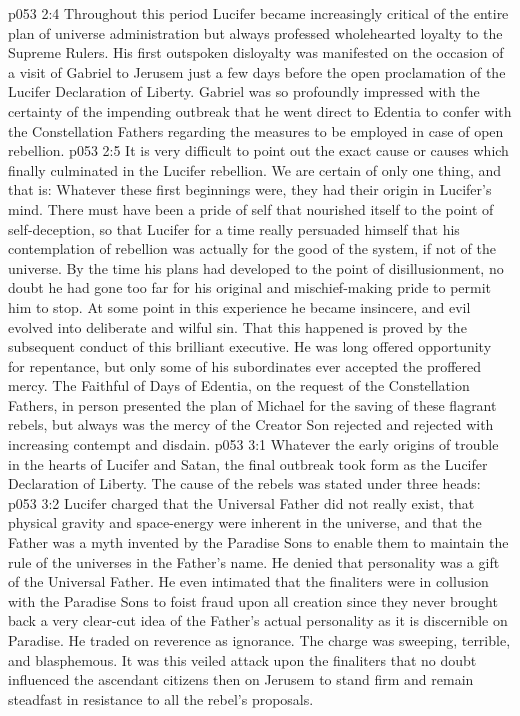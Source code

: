 \vs p053 2:4 Throughout this period Lucifer became increasingly critical of the entire plan of universe administration but always professed wholehearted loyalty to the Supreme Rulers. His first outspoken disloyalty was manifested on the occasion of a visit of Gabriel to Jerusem just a few days before the open proclamation of the Lucifer Declaration of Liberty. Gabriel was so profoundly impressed with the certainty of the impending outbreak that he went direct to Edentia to confer with the Constellation Fathers regarding the measures to be employed in case of open rebellion.
\vs p053 2:5 It is very difficult to point out the exact cause or causes which finally culminated in the Lucifer rebellion. We are certain of only one thing, and that is: Whatever these first beginnings were, they had their origin in Lucifer’s mind. There must have been a pride of self that nourished itself to the point of self\hyp{}deception, so that Lucifer for a time really persuaded himself that his contemplation of rebellion was actually for the good of the system, if not of the universe. By the time his plans had developed to the point of disillusionment, no doubt he had gone too far for his original and mischief\hyp{}making pride to permit him to stop. At some point in this experience he became insincere, and evil evolved into deliberate and wilful sin. That this happened is proved by the subsequent conduct of this brilliant executive. He was long offered opportunity for repentance, but only some of his subordinates ever accepted the proffered mercy. The Faithful of Days of Edentia, on the request of the Constellation Fathers, in person presented the plan of Michael for the saving of these flagrant rebels, but always was the mercy of the Creator Son rejected and rejected with increasing contempt and disdain.
\vs p053 3:1 Whatever the early origins of trouble in the hearts of Lucifer and Satan, the final outbreak took form as the Lucifer Declaration of Liberty. The cause of the rebels was stated under three heads:
\vs p053 3:2 \bibnobreakspace {} Lucifer charged that the Universal Father did not really exist, that physical gravity and space\hyp{}energy were inherent in the universe, and that the Father was a myth invented by the Paradise Sons to enable them to maintain the rule of the universes in the Father’s name. He denied that personality was a gift of the Universal Father. He even intimated that the finaliters were in collusion with the Paradise Sons to foist fraud upon all creation since they never brought back a very clear\hyp{}cut idea of the Father’s actual personality as it is discernible on Paradise. He traded on reverence as ignorance. The charge was sweeping, terrible, and blasphemous. It was this veiled attack upon the finaliters that no doubt influenced the ascendant citizens then on Jerusem to stand firm and remain steadfast in resistance to all the rebel’s proposals.
